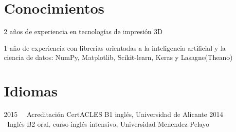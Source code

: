 \documentclass[]{friggeri-cv}
\begin{document}
\section{Conocimientos}
2 años de experiencia en tecnologías de impresión 3D

1 año de experiencia con librerías orientadas a la inteligencia artificial y la
\\ciencia de datos: NumPy, Matplotlib, Scikit-learn, Keras y Lasagne(Theano)

\section{Idiomas}

\entry
{2015~} {~Acreditación CertACLES B1 inglés, Universidad de Alicante}{}{}
\entry
{2014~} {~Inglés B2 oral, curso inglés intensivo, Universidad Menendez Pelayo}{}{}
\end{document}
